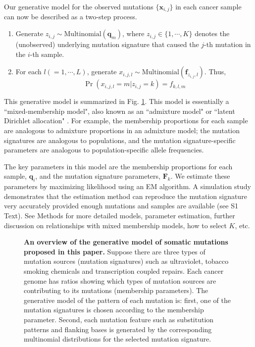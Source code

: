 \documentclass[10pt,letterpaper]{article}
\begin{document}
Our generative model for the observed mutations $\{ \bm{x}_{i,j} \}$ in each
cancer sample can now be described as a two-step process.
\begin{enumerate}
\item
Generate $z_{i,j} \sim \text{Multinomial} (\bm{q}_m)$, where $z_{i,j} \in \{1,\cdots,K \}$ denotes the (unobserved) underlying mutation signature that caused the $j$-th mutation in the $i$-th sample.
\item 
For each $l (= 1, \cdots, L)$, generate $x_{i,j,l} \sim \text{Multinomial}(\bm{f}_{z_{i,j},l})$.
Thus, 
\begin{equation}
\Pr(x_{i,j,l} = m | z_{i,j}=k) = f_{k,l,m} 
\end{equation}
\end{enumerate}

This generative model is summarized in Fig. \ref{methodOverview}.
This model is essentially a ``mixed-membership model", also known as an ``admixture model" \cite{pmid10835412} or ``latent Dirichlet allocation" \cite{Blei:2003}. For example,
the membership proportions for each sample are analogous to admixture proportions in an admixture model; the mutation signatures are analogous to 
populations, and the mutation signature-specific parameters are analogous to population-specific allele frequencies.

The key parameters in this model
are the membership proportions for each sample, $\bm{q}_i$, and the mutation signature parameters, $\bm{F}_k$. 
We estimate these parameters by maximizing likelihood using an EM algorithm. 
A simulation study demonstrates that the estimation method can reproduce the mutation signature very accurately 
provided enough mutations and samples are available (see S1 Text). 
See Methods for more detailed models, parameter estimation, further discussion on relationships with mixed membership models, how to select $K$, etc.


\begin{figure}[h]
\caption{{\bf An overview of the generative model of somatic mutations proposed in this paper.} 
Suppose there are three types of mutation sources (mutation signatures) such as ultraviolet, tobacco smoking chemicals and transcription coupled repairs.
Each cancer genome has ratios showing which types of mutation sources are contributing to its mutations (membership parameters).
The generative model of the pattern of each mutation is:
first, one of the mutation signatures is chosen according to the membership parameter.
Second, each mutation feature such as substitution patterns and flanking bases is generated 
by the corresponding multinomial distributions for the selected mutation signature.
}
\label{methodOverview}
\end{figure}
\end{document}
